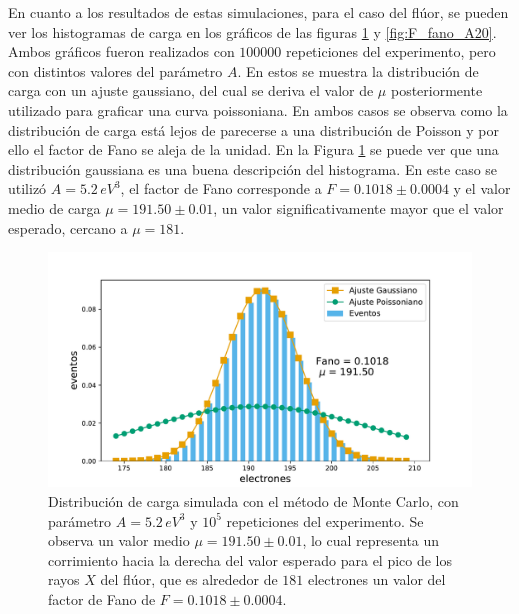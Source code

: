 En cuanto a los resultados de estas simulaciones, para el caso del flúor, se pueden ver los histogramas de carga en los gráficos de las figuras \ref{fig:F_fano_A5.2} y \ref{fig:F_fano_A20}. Ambos gráficos fueron realizados con $100000$ repeticiones del experimento, pero con distintos valores del parámetro $A$. En estos se muestra la distribución de carga con un ajuste gaussiano, del cual se deriva el valor de $\mu$ posteriormente utilizado para graficar una curva poissoniana. En ambos casos se observa como la distribución de carga está lejos de parecerse a una distribución de Poisson y por ello el factor de Fano se aleja de la unidad. En la Figura \ref{fig:F_fano_A5.2} se puede ver que una distribución gaussiana es una buena descripción del histograma. En este caso se utilizó $A = 5.2\,\si{eV}^{3}$, el factor de Fano corresponde a $F = 0.1018 \pm 0.0004$ y el valor medio de carga $\mu = 191.50 \pm 0.01$, un valor significativamente mayor que el valor esperado, cercano a $\mu = 181$.
\begin{figure}[h]
    \centering
    \includegraphics[scale=0.5]{Figs/F_Fano_E677_A5.2_Eloss0_100ktrials.pdf}
    \caption{Distribución de carga simulada con el método de Monte Carlo, con parámetro $A = 5.2\,\si{eV}^{3}$ y $10^{5}$ repeticiones del experimento. Se observa un valor medio $\mu = 191.50 \pm 0.01$, lo cual representa un corrimiento hacia la derecha del valor esperado para el pico de los rayos $X$ del flúor, que es alrededor de $181$ electrones un valor del factor de Fano de $F = 0.1018 \pm 0.0004$.}
    \label{fig:F_fano_A5.2}
\end{figure}
